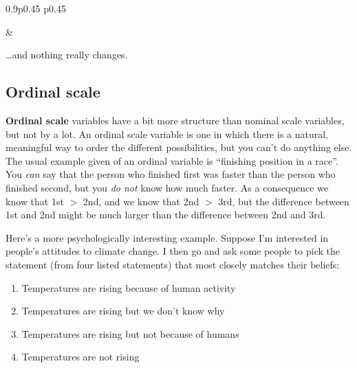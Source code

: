 \documentclass[
  a4paper,
]{book}
\providecommand{\tightlist}{%
  \setlength{\itemsep}{0pt}\setlength{\parskip}{0pt}}\usepackage{longtable,booktabs,array}
\begin{document}
\begin{table}[h!]
\begin{centerbox}
\begin{threeparttable}
\begin{tabularx}{0.9\textwidth}{p{} p{}}
\hhline{}

 &
 \tabularnewline[-0.5pt]


\end{tabularx} 

\end{threeparttable}\par\end{centerbox}

\end{table}
 

\ldots and nothing really changes.

\hypertarget{ordinal-scale}{%
\subsection{Ordinal scale}\label{ordinal-scale}}

\textbf{Ordinal scale} variables have a bit more structure than nominal
scale variables, but not by a lot. An ordinal scale variable is one in
which there is a natural, meaningful way to order the different
possibilities, but you can't do anything else. The usual example given
of an ordinal variable is ``finishing position in a race''. You
\emph{can} say that the person who finished first was faster than the
person who finished second, but you \emph{do not} know how much faster.
As a consequence we know that 1st \(>\) 2nd, and we know that 2nd \(>\)
3rd, but the difference between 1st and 2nd might be much larger than
the difference between 2nd and 3rd.

Here's a more psychologically interesting example. Suppose I'm
interested in people's attitudes to climate change. I then go and ask
some people to pick the statement (from four listed statements) that
most closely matches their beliefs:

\begin{enumerate}
\def\labelenumi{\arabic{enumi}.}
\tightlist
\item
  Temperatures are rising because of human activity
\item
  Temperatures are rising but we don't know why
\item
  Temperatures are rising but not because of humans
\item
  Temperatures are not rising
\end{enumerate}
\end{document}
